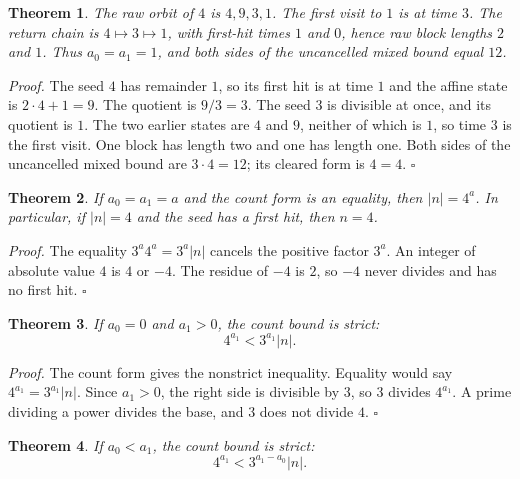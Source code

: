 \documentclass[11pt,letterpaper]{article}
\newtheorem{theorem}{Theorem}
\newenvironment{proof}{\noindent\textit{Proof.}}{\hfill\(\square\)}
\begin{document}
\begin{theorem}
\label{thm:mixedfour}
The raw orbit of \(4\) is \(4,9,3,1\). The first visit to \(1\) is at time \(3\). The return chain is \(4\mapsto 3\mapsto 1\), with first-hit times \(1\) and \(0\), hence raw block lengths \(2\) and \(1\). Thus \(a_0=a_1=1\), and both sides of the uncancelled mixed bound equal \(12\).
\end{theorem}

\begin{proof}
The seed \(4\) has remainder \(1\), so its first hit is at time \(1\) and the affine state is \(2\cdot 4+1=9\). The quotient is \(9/3=3\). The seed \(3\) is divisible at once, and its quotient is \(1\). The two earlier states are \(4\) and \(9\), neither of which is \(1\), so time \(3\) is the first visit. One block has length two and one has length one. Both sides of the uncancelled mixed bound are \(3\cdot4=12\); its cleared form is \(4=4\).
\end{proof}

\begin{theorem}
\label{thm:equalpower}
If \(a_{0}=a_{1}=a\) and the count form is an equality, then \(|n|=4^{a}\). In particular, if \(|n|=4\) and the seed has a first hit, then \(n=4\).
\end{theorem}

\begin{proof}
The equality \(3^{a}4^{a}=3^{a}|n|\) cancels the positive factor \(3^{a}\). An integer of absolute value \(4\) is \(4\) or \(-4\). The residue of \(-4\) is \(2\), so \(-4\) never divides and has no first hit.
\end{proof}

\begin{theorem}
\label{thm:puretwostrict}
If \(a_{0}=0\) and \(a_{1}>0\), the count bound is strict:
\[
4^{a_{1}}<3^{a_{1}}|n|.
\]
\end{theorem}

\begin{proof}
The count form gives the nonstrict inequality. Equality would say \(4^{a_{1}}=3^{a_{1}}|n|\). Since \(a_{1}>0\), the right side is divisible by \(3\), so \(3\) divides \(4^{a_{1}}\). A prime dividing a power divides the base, and \(3\) does not divide \(4\).
\end{proof}

\begin{theorem}
\label{thm:moretwos}
If \(a_{0}<a_{1}\), the count bound is strict:
\[
4^{a_{1}}<3^{a_{1}-a_{0}}|n|.
\]
\end{theorem}
\end{document}
